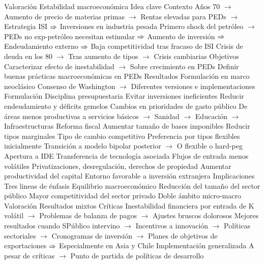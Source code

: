 \documentclass{nuevotema}
\begin{document}
\begin{esquemal}
			\3 Valoración
		\2 Estabilidad macroeconómica
			\3 Idea clave
				\4 Contexto
				\4[] Años 70
				\4[] $\to$ Aumento de precio de materias primas
				\4[] $\to$ Rentas elevadas para PEDs
				\4[] $\to$ Estrategia ISI
				\4[] $\Rightarrow$ Inversiones en industria pesada
				\4[] Primero shock del petróleo
				\4[] $\to$ PEDs no exp-petróleo necesitan estimular
				\4[] $\Rightarrow$ Aumento de inversión
				\4[] $\Rightarrow$ Endeudamiento externo
				\4[] $\Rightarrow$ Baja competitividad tras fracaso de ISI
				\4[] Crisis de deuda en los 80
				\4[] $\to$ Tras aumento de tipos
				\4[] $\to$ Crisis cambiarias
				\4 Objetivos
				\4[] Caracterizar efecto de inestabilidad
				\4[] $\to$ Sobre crecimiento en PEDs
				\4[] Definir buenas prácticas macroeconómicas en PEDs
				\4 Resultados
				\4[] Formulación en marco neoclásico
				\4[] Consenso de Washington
				\4[] $\to$ Diferentes versiones e implementaciones
			\3 Formulación
				\4[i] Disciplina presupuestaria
				\4[] Evitar inversiones ineficientes
				\4[] Reducir endeudamiento y déficits gemelos
				\4[ii] Cambios en prioridades de gasto público
				\4[] De áreas menos productivas a servicios básicos
				\4[] $\to$ Sanidad
				\4[] $\to$ Educación
				\4[] $\to$ Infraestructuras
				\4[iii] Reforma fiscal
				\4[] Aumentar tamaño de bases imponibles
				\4[] Reducir tipos marginales
				\4[iv] Tipo de cambio competitivo
				\4[] Preferencia por tipos flexibles inicialmente
				\4[] Transición a modelo bipolar posterior
				\4[] $\to$ O flexible o hard-peg
				\4[v] Apertura a IDE
				\4[] Transferencia de tecnología asociada
				\4[] Flujos de entrada menos volátiles
				\4[vi] Privatizaciones, desregulación, derechos de propiedad
				\4[] Aumentar productividad del capital
				\4[] Entorno favorable a inversión extranjera
			\3 Implicaciones
				\4 Tres lineas de énfasis
				\4[] Equilibrio macroeconómico
				\4[] Reducción del tamaño del sector público
				\4[] Mayor competitividad del sector privado
				\4 Doble ámbito micro-macro
			\3 Valoración
				\4 Resultados mixtos
				\4 Críticas
				\4[] Inestabilidad financiera por entrada de K volátil
				\4[] $\to$ Problemas de balanza de pagos
				\4[] $\to$ Ajustes bruscos dolorosos
				\4[] Mejores resultados cuando SPúblico intervino
				\4[] $\to$ Incentivos a innovación
				\4[] $\to$ Políticas sectoriales
				\4[] $\to$ Cronogramas de inversión
				\4[] $\to$ Planes de objetivos de exportaciones
				\4[] $\Rightarrow$ Especialmente en Asia y Chile
				\4 Implementación generalizada
				\4[] A pesar de críticas
				\4[] $\to$ Punto de partida de políticas de desarrollo

\end{esquemal}
\end{document}
